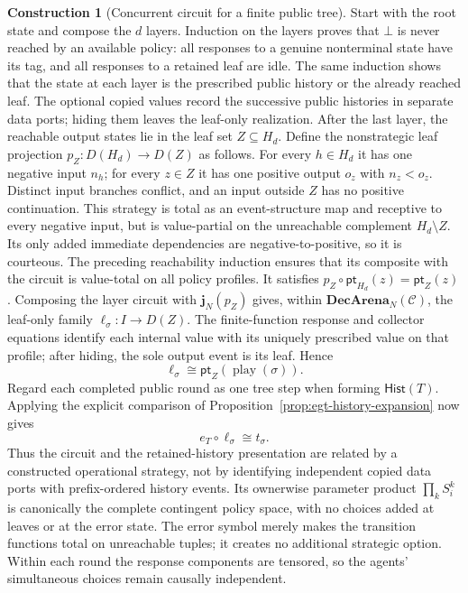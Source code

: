 \documentclass[11pt,a4paper]{article}
\numberwithin{equation}{section}
\theoremstyle{definition}
\newtheorem{construction}[construction]{Construction}
\theoremstyle{remark}
\theoremstyle{plain}
\begin{document}
\begin{construction}[Concurrent circuit for a finite public tree]
Start with the root state and compose the $d$ layers. Induction on the
layers proves that $\bot$ is never reached by an available policy: all
responses to a genuine nonterminal state have its tag, and all responses
to a retained leaf are idle. The same induction shows that the state at
each layer is the prescribed public history or the already reached leaf.
The optional copied values record the successive public histories in
separate data ports; hiding them leaves the leaf-only realization.
After the last layer, the reachable output states lie in the leaf set
$Z\subseteq H_d$. Define the nonstrategic leaf projection
$p_Z:D(H_d)\to D(Z)$ as follows. For every $h\in H_d$ it has one
negative input $n_h$; for every $z\in Z$ it has one positive output
$o_z$ with $n_z<o_z$. Distinct input branches conflict, and an input
outside $Z$ has no positive continuation. This strategy is total as
an event-structure map and receptive to every negative input, but is
value-partial on the unreachable complement $H_d\setminus Z$.
Its only added immediate dependencies are negative-to-positive, so it is
courteous. The preceding reachability induction ensures that its
composite with the circuit is value-total on all policy profiles.
It satisfies $p_Z\circ\mathsf{pt}_{H_d}(z)=\mathsf{pt}_Z(z)$.
Composing the layer circuit with $\mathbf j_N(p_Z)$ gives, within
$\mathbf{DecArena}_N(\mathcal C)$, the leaf-only family
$\ell_\sigma:I\to D(Z)$. The finite-function response and collector
equations identify each internal value with its uniquely prescribed value
on that profile; after hiding, the sole output event is its leaf. Hence
\[
 \ell_\sigma\cong
 \mathsf{pt}_Z(\operatorname{play}(\sigma)).
\]
Regard each completed public round as one tree step when forming
$\mathsf{Hist}(T)$. Applying the explicit comparison of
Proposition~\ref{prop:egt-history-expansion} now gives
\[
 e_T\circ\ell_\sigma\cong t_\sigma.
\]
Thus the circuit and the retained-history presentation are related by
a constructed operational strategy, not by identifying independent
copied data ports with prefix-ordered history events. Its ownerwise parameter product
$\prod_k S_i^k$ is canonically the complete contingent policy space,
with no choices added at leaves or at the error state. The error
symbol merely makes the transition functions total on unreachable
tuples; it creates no additional strategic option. Within each round
the response components are tensored, so the agents' simultaneous choices remain causally independent.
\end{construction}
\end{document}
